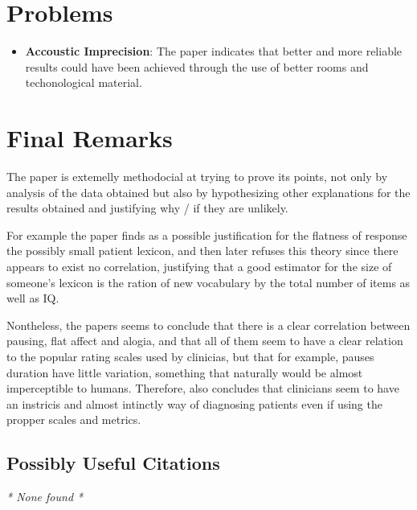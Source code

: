 \documentclass{Paper_Summary}
\begin{document}
\section{Problems}
    \begin{itemize}
        \item \textbf{Accoustic Imprecision}: The paper indicates that better and more reliable results could have been achieved through the use of better rooms and techonological material.
    \end{itemize}


\section{Final Remarks}
    
    The paper is extemelly methodocial at trying to prove its points, not only by analysis of the data obtained but also by hypothesizing other explanations for the results obtained and justifying why / if they are unlikely.

    For example the paper finds as a possible justification for the flatness of response the possibly small patient lexicon, and then later refuses this theory since there appears to exist no correlation, justifying that a good estimator for the size of someone's lexicon is the ration of new vocabulary by the total number of items as well as IQ.

    Nontheless, the papers seems to conclude that there is a clear correlation between pausing, flat affect and alogia, and that all of them seem to have a clear relation to the popular rating scales used by clinicias, but that for example, pauses duration have little variation, something that naturally would be almost imperceptible to humans. Therefore, also concludes that clinicians seem to have an instricis and almost intinctly way of diagnosing patients even if using the propper scales and metrics.

\breakline

\begin{center}
    \section*{Possibly Useful Citations}
\end{center}
\emph{* None found *}
\end{document}
